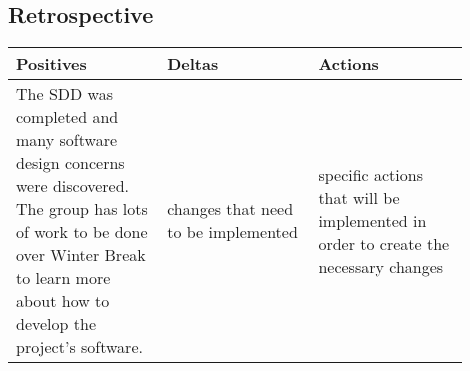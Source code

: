 \documentclass[letterpaper,10pt,serif,draftclsnofoot,onecolumn,compsoc,titlepage]{IEEEtran}
\begin{document}
\subsection{Retrospective}

\begin{tabular}{|p{0.3\linewidth}|p{0.3\linewidth}|p{0.3\linewidth}|}
   \hline
   \textbf{Positives} & \textbf{Deltas} & \textbf{Actions}\\ 
   \hline
   The SDD was completed and many software design concerns were discovered. The group 
   has lots of work to be done over Winter Break to learn more about how to develop 
   the project's software.  
   & 
   changes that need to be implemented 
   & 
   specific actions that will be implemented in order to create the necessary 
   changes \\
   \hline
\end{tabular}


\nocite{*}
\end{document}
